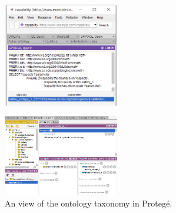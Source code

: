 \documentclass[sw]{iosart2x}
\begin{document}
\begin{figure}[t]
  \centering
  \includegraphics[width=0.45\textwidth]{query_screenshot.PNG}
  \caption{\label{fig:screen_query}}
\end{figure}

\begin{figure}
  \centering
  \includegraphics[width=0.45\textwidth]{entities_screenshot.PNG}
  \caption{An view of the ontology taxonomy in Protegé.\label{fig:screen_entities}}
\end{figure}
\end{document}
